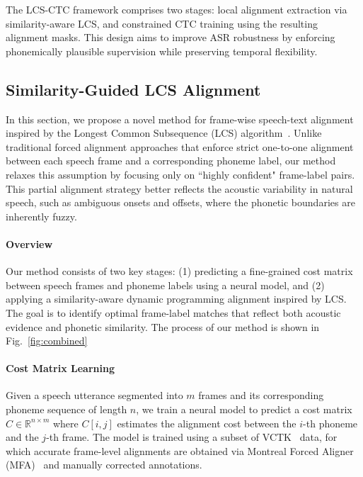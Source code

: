 The LCS-CTC framework comprises two stages: local alignment extraction via similarity-aware LCS, and constrained CTC training using the resulting alignment masks. This design aims to improve ASR robustness by enforcing phonemically plausible supervision while preserving temporal flexibility.

\subsection{Similarity-Guided LCS Alignment}
\label{sec:lcs-align}

In this section, we propose a novel method for frame-wise speech-text alignment inspired by the Longest Common Subsequence (LCS) algorithm~\cite{hirschberg1977algorithms-lcs1}. Unlike traditional forced alignment approaches that enforce strict one-to-one alignment between each speech frame and a corresponding phoneme label, our method relaxes this assumption by focusing only on “highly confident" frame-label pairs. This partial alignment strategy better reflects the acoustic variability in natural speech, such as ambiguous onsets and offsets, where the phonetic boundaries are inherently fuzzy.

\paragraph{Overview} Our method consists of two key stages: (1) predicting a fine-grained cost matrix between speech frames and phoneme labels using a neural model, and (2) applying a similarity-aware dynamic programming alignment inspired by LCS. The goal is to identify optimal frame-label matches that reflect both acoustic evidence and phonetic similarity. The process of our method is shown in Fig.~\ref{fig:combined}

\paragraph{Cost Matrix Learning} Given a speech utterance segmented into $m$ frames and its corresponding phoneme sequence of length $n$, we train a neural model to predict a cost matrix $C \in \mathbb{R}^{n \times m}$ where $C[i,j]$ estimates the alignment cost between the $i$-th phoneme and the $j$-th frame. The model is trained using a subset of VCTK~\cite{yamagishi2019cstr-vctk} data, for which accurate frame-level alignments are obtained via Montreal Forced Aligner (MFA)~\cite{mcauliffe17_interspeech} and manually corrected annotations.


